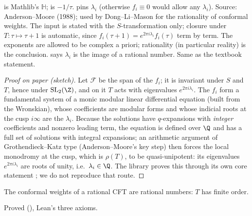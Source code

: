 \begin{dictionary}
 is Mathlib's $\mathbb H$;  is $-1/\tau$.  pins $\lambda_i$
(otherwise $f_i\equiv0$ would allow any $\lambda_i$). Source: Anderson--Moore (1988); used by Dong--Li--Mason for the
rationality of conformal weights. The input is stated with the $S$-transformation only; closure under
$T:\tau\mapsto\tau+1$ is automatic, since $f_i(\tau+1)=e^{2\pi i\lambda_i}f_i(\tau)$ term by term. The exponents are
allowed to be complex a priori; rationality (in particular reality) is the conclusion. 
says $\lambda_i$ is the image of a rational number. Same as the textbook statement.
\end{dictionary}

\begin{proof}[Proof on paper (sketch)]
Let $\mathcal F$ be the span of the $f_i$; it is invariant under $S$ and $T$, hence under $\mathrm{SL}_2(\Z)$, and on it
$T$ acts with eigenvalues $e^{2\pi i\lambda_i}$. The $f_i$ form a fundamental system of a monic modular linear
differential equation (built from the Wronskian), whose coefficients are modular forms and whose indicial roots at the
cusp $i\infty$ are the $\lambda_i$. Because the solutions have $q$-expansions with \emph{integer} coefficients and nonzero
leading term, the equation is defined over $\Q$ and has a full set of solutions with integral expansions; an
arithmetic argument of Grothendieck--Katz type (Anderson--Moore's key step) then forces the local monodromy at the cusp,
which is $\rho(T)$, to be quasi-unipotent: its eigenvalues $e^{2\pi i\lambda_i}$ are roots of unity, i.e.\
$\lambda_i\in\Q$. The library proves this through its own core statement ; we do not reproduce
that route.
\end{proof}

\begin{physics}
The conformal weights of a rational CFT are rational numbers: $T$ has finite order.
\end{physics}

\begin{status}
Proved (), Lean's three axioms.
\end{status}


